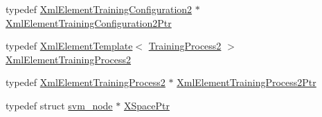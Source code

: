 \begin{DoxyCompactItemize}
typedef \hyperlink{namespace_k_k_m_l_l_a959ad458aebdb6b8716a6946c6d0f720}{Xml\+Element\+Training\+Configuration2} $\ast$ \hyperlink{namespace_k_k_m_l_l_a1602f508032f268ebda5c2c1d2840cfc}{Xml\+Element\+Training\+Configuration2\+Ptr}
\item 
typedef \hyperlink{class_k_k_b_1_1_xml_element_template}{Xml\+Element\+Template}$<$ \hyperlink{class_k_k_m_l_l_1_1_training_process2}{Training\+Process2} $>$ \hyperlink{namespace_k_k_m_l_l_a2204408f06b7e47e27b81e52b929ea94}{Xml\+Element\+Training\+Process2}
\item 
typedef \hyperlink{namespace_k_k_m_l_l_a2204408f06b7e47e27b81e52b929ea94}{Xml\+Element\+Training\+Process2} $\ast$ \hyperlink{namespace_k_k_m_l_l_a06e10f206a9dcebf9f151ad6e3e6a3a9}{Xml\+Element\+Training\+Process2\+Ptr}
\item 
typedef struct \hyperlink{struct_s_v_m233_1_1svm__node}{svm\+\_\+node} $\ast$ \hyperlink{namespace_k_k_m_l_l_abbdd347e3f7ba84af6a5452ef7a0cfef}{X\+Space\+Ptr}
\end{DoxyCompactItemize}
